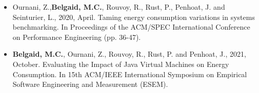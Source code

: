 \documentclass[10pt,a4paper,ragged2e,withhyper]{altacv}
\begin{document}
\begin{paracol}{2}

  \divider

  \divider


  \switchcolumn
  \medskip


  \medskip

  \begin{itemize}
    \item  Ournani, Z.,\textbf{Belgaid, M.C.}, Rouvoy, R., Rust, P., Penhoat, J. and Seinturier, L., 2020, April. Taming energy consumption variations in systems benchmarking. In Proceedings of the ACM/SPEC International Conference on Performance Engineering (pp. 36-47).
          \medskip
    \item  \textbf{Belgaid, M.C.}, Ournani, Z., Rouvoy, R., Rust, P. and Penhoat, J., 2021, October. Evaluating the Impact of Java Virtual Machines on Energy Consumption. In 15th ACM/IEEE International Symposium on Empirical Software Engineering and Measurement (ESEM).

  \end{itemize}


\end{paracol}
\end{document}
